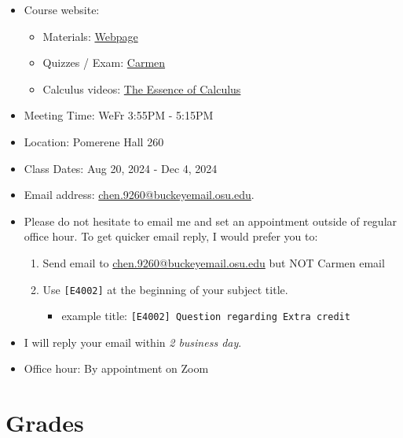 \documentclass[12pt]{article}
\begin{document}
\begin{itemize}
    \item Course website:
    \begin{itemize}
        \item Materials: \href{https://huijunchen9260.github.io/IntermediateMacroAutumn2024.html}{Webpage}
        \item Quizzes / Exam: \href{https://osu.instructure.com/courses/143643}{Carmen}
        \item Calculus videos: \href{https://www.youtube.com/watch?v=WUvTyaaNkzM&list=PLZHQObOWTQDMsr9K-rj53DwVRMYO3t5Yr}{The Essence of Calculus}
    \end{itemize}
    \item Meeting Time: WeFr 3:55PM - 5:15PM
    \item Location: Pomerene Hall 260
    \item Class Dates: Aug 20, 2024 - Dec 4, 2024
    \item Email address: \href{chen.9260@buckeyemail.osu.edu}{chen.9260@buckeyemail.osu.edu}.
    \item Please do not hesitate to email me and set an appointment outside of regular office hour. To get quicker email reply, I would prefer you to:
    \begin{enumerate}
        \item Send email to \href{chen.9260@buckeyemail.osu.edu}{chen.9260@buckeyemail.osu.edu} but NOT Carmen email
        \item Use \texttt{[E4002]} at the beginning of your subject title.
        \begin{itemize}
            \item example title: \texttt{[E4002] Question regarding Extra credit}
        \end{itemize}
    \end{enumerate}
    \item I will reply your email within \textit{2 business day}.
    \item Office hour: By appointment on Zoom
\end{itemize}

\newpage

\section*{Grades}
\end{document}
